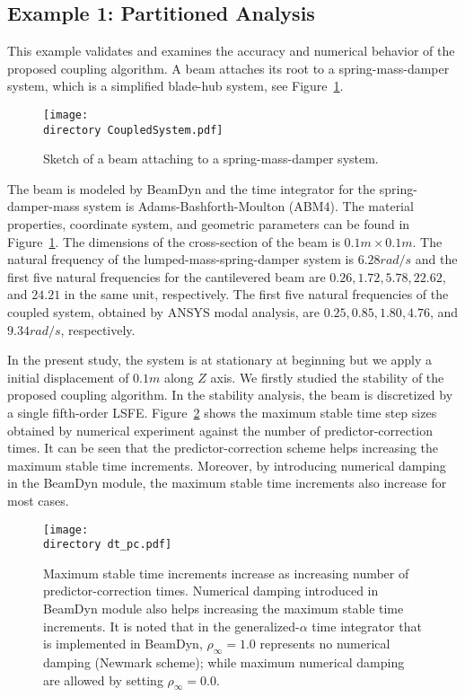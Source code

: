 \documentclass{aiaa-tc}
\def\directory{EPSF/}
\begin{document}
 \subsection{Example 1: Partitioned Analysis}
 This example validates and examines the accuracy and numerical behavior of the proposed coupling algorithm. A beam attaches its root to a spring-mass-damper system, which is a simplified blade-hub system, see Figure~\ref{fig:CoupledSystem}. 
 \begin{figure}
\centering
\texttt{[image: \\directory CoupledSystem.pdf]}
\caption{Sketch of a beam attaching to a spring-mass-damper system.} 
\label{fig:CoupledSystem}
\end{figure}
 The beam is modeled by BeamDyn and the time integrator for the spring-damper-mass system is Adams-Bashforth-Moulton (ABM4). The material properties, coordinate system, and geometric parameters can be found in Figure~\ref{fig:CoupledSystem}. The dimensions of the cross-section of the beam is $0.1m \times 0.1m$. The natural frequency of the lumped-mass-spring-damper system is $6.28 rad/s$ and the first five natural frequencies for the cantilevered beam are $0.26, 1.72, 5.78, 22.62$, and $24.21$ in the same unit, respectively. The first five natural frequencies of the coupled system, obtained by ANSYS modal analysis, are $0.25, 0.85, 1.80, 4.76$, and $9.34 rad/s$, respectively.
 
 In the present study, the system is at stationary at beginning but we apply a initial displacement of $0.1m$ along $Z$ axis. We firstly studied the stability of the proposed coupling algorithm. In the stability analysis, the beam is discretized by a single fifth-order LSFE. Figure~\ref{fig:CoupledDTPC} shows the maximum stable time step sizes obtained by numerical experiment against the number of predictor-correction times. It can be seen that the predictor-correction scheme helps increasing the maximum stable time increments. Moreover, by introducing numerical damping in the BeamDyn module, the maximum stable time increments also increase for most cases.
 \begin{figure}
\centering
\texttt{[image: \\directory dt\_pc.pdf]}
\caption{Maximum stable time increments increase as increasing number of predictor-correction times. Numerical damping introduced in BeamDyn module also helps increasing the maximum stable time increments. It is noted that in the generalized-$\alpha$ time integrator that is implemented in BeamDyn, $\rho_\infty = 1.0$ represents no numerical damping (Newmark scheme); while maximum numerical damping are allowed by setting $\rho_\infty = 0.0$. } 
\label{fig:CoupledDTPC}
\end{figure}
 
\end{document}
